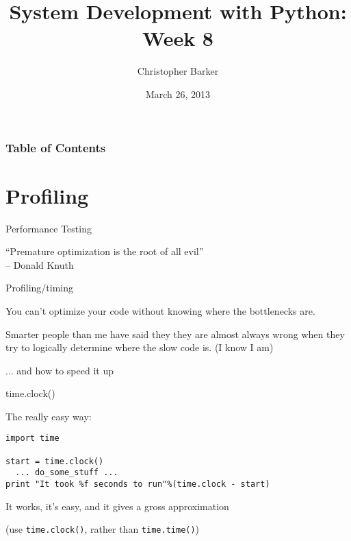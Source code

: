 \documentclass{beamer}
\title[Python Certificate: System Development]{System Development with Python: Week 8}
\author{Christopher Barker}
\institute{UW Continuing Education}
\date{March 26, 2013}
\begin{document}
\begin{frame}
  \titlepage
\end{frame}

\begin{frame}
\frametitle{Table of Contents}
  \tableofcontents
\end{frame}


\section{Profiling}

\begin{frame}[fragile]{Performance Testing}

{\Large ``Premature optimization is the root of all evil''}\\[0.1in]
{\large \hspace{0.5in} -- Donald Knuth}

\end{frame} 

\begin{frame}[fragile]{Profiling/timing}

\vfill
{\Large You can't optimize your code without knowing where the bottlenecks are.}

\vfill
{\Large Smarter people than me have said they they are almost always wrong
when they try to logically determine where the slow code is. (I know I am)}

\vfill
{\Large ... and how to speed it up}

\end{frame} 

\begin{frame}[fragile]{time.clock()}

{\Large The really easy way:}

\begin{verbatim}
import time

start = time.clock()
  ... do_some_stuff ...
print "It took %f seconds to run"%(time.clock - start)
\end{verbatim}

{\Large It works, it's easy, and it gives a gross approximation}

\vfill
(use \verb|time.clock()|, rather than \verb|time.time()|)

\end{frame} 
\end{document}
